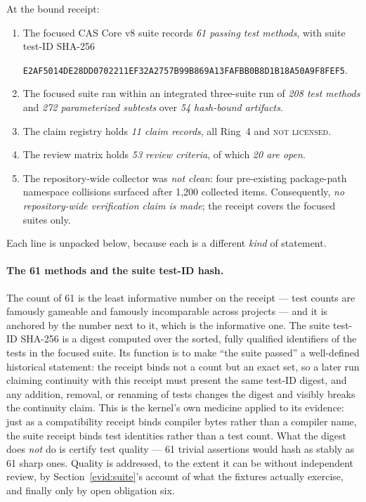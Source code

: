\begin{finding}\label{evid:find:receipt}
At the bound receipt:
\begin{enumerate}
\item The focused CAS Core v8 suite records \emph{61 passing test methods}, with suite test-ID SHA-256
\begin{center}
\texttt{E2AF5014DE28DD0702211EF32A2757B99B869A13FAFBB0B8D1B18A50A9F8FEF5}.
\end{center}
\item The focused suite ran within an integrated three-suite run of \emph{208 test methods} and \emph{272 parameterized subtests} over \emph{54 hash-bound artifacts}.
\item The claim registry holds \emph{11 claim records}, all Ring~4 and \textsc{not licensed}.
\item The review matrix holds \emph{53 review criteria}, of which \emph{20 are open}.
\item The repository-wide collector was \emph{not clean}: four pre-existing package-path namespace collisions surfaced after 1{,}200 collected items. Consequently, \emph{no repository-wide verification claim is made}; the receipt covers the focused suites only.
\end{enumerate}
\end{finding}

Each line is unpacked below, because each is a different \emph{kind} of statement.

\paragraph{The 61 methods and the suite test-ID hash.} The count of 61 is the least informative number on the receipt --- test counts are famously gameable and famously incomparable across projects --- and it is anchored by the number next to it, which is the informative one. The suite test-ID SHA-256 is a digest computed over the sorted, fully qualified identifiers of the tests in the focused suite. Its function is to make ``the suite passed'' a well-defined historical statement: the receipt binds not a count but an exact set, so a later run claiming continuity with this receipt must present the same test-ID digest, and any addition, removal, or renaming of tests changes the digest and visibly breaks the continuity claim. This is the kernel's own medicine applied to its evidence: just as a compatibility receipt binds compiler bytes rather than a compiler name, the suite receipt binds test identities rather than a test count. What the digest does \emph{not} do is certify test quality --- 61 trivial assertions would hash as stably as 61 sharp ones. Quality is addressed, to the extent it can be without independent review, by Section~\ref{evid:suite}'s account of what the fixtures actually exercise, and finally only by open obligation six.

